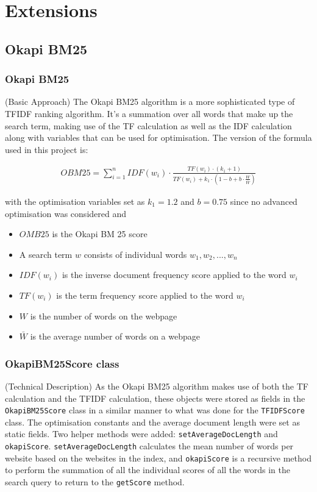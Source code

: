 \chapter{Extensions}


\section{Okapi BM25}

\subsection{Okapi BM25} (Basic Approach)
The Okapi BM25 algorithm is a more sophisticated type of TFIDF ranking algorithm.
It's a summation over all words that make up the search term, making use of the TF calculation as well as the IDF calculation along with variables that can be used for optimisation.
The version of the formula used in this project is:

\begin{align}
    OBM25 = \sum_{i=1}^n IDF(w_i) \cdot \frac{TF(w_i)\cdot (k_1 + 1)}{TF(w_i) + k_1\cdot(1 - b + b\cdot \frac{W}{\bar{W}})}
\label{eq:OBM25}
\end{align}

with the optimisation variables set as $k_1 = 1.2$ and $b = 0.75$ since no advanced optimisation was considered and

\begin{itemize}
    \item $OMB25$ is the Okapi BM 25 score
    \item A search term $w$ consists of individual words $w_1, w_2, ..., w_n$
    \item $IDF(w_i)$ is the inverse document frequency score applied to the word $w_i$
    \item $TF(w_i)$ is the term frequency score applied to the word $w_i$
    \item $W$ is the number of words on the webpage
    \item $\bar{W}$ is the average number of words on a webpage
\end{itemize}

\subsection{OkapiBM25Score class} (Technical Description)
As the Okapi BM25 algorithm makes use of both the TF calculation and the TFIDF calculation, these objects were stored as fields in the {\tt OkapiBM25Score} class in a similar manner to what was done for the {\tt TFIDFScore} class.
The optimisation constants and the average document length were set as static fields.
Two helper methods were added: {\tt setAverageDocLength} and {\tt okapiScore}. {\tt setAverageDocLength} calculates the mean number of words per website based on the websites in the index, and {\tt okapiScore} is a recursive method to perform the summation of all the individual scores of all the words in the search query to return to the {\tt getScore} method.

